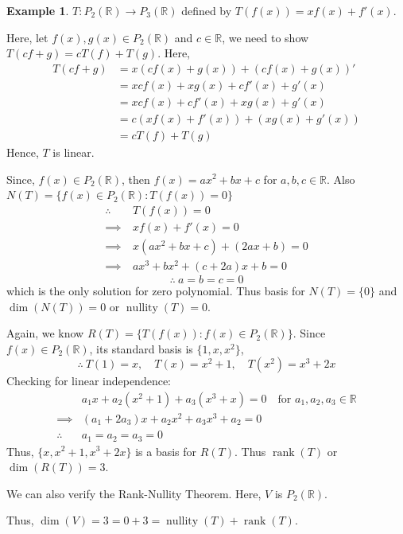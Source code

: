 \documentclass[12pt, a4paper]{article}
\theoremstyle{definition}
\newtheorem{example}{Example}[section]
\theoremstyle{remark}
\DeclareMathOperator{\nullity}{nullity}
\DeclareMathOperator{\rank}{rank}
\begin{document}
\begin{example}
    $T:P_2(\mathbb{R}) \to P_3(\mathbb{R})$ defined by $T(f(x))=xf(x)+f'(x)$.

    Here, let $f(x),g(x) \in P_2(\mathbb{R})$ and $c \in \mathbb{R}$, we need to show $T(cf+g)=cT(f)+T(g)$. Here,
    \begin{align*}
        T(cf+g) &= x(cf(x)+g(x))+(cf(x)+g(x))' \\
        &= xcf(x)+xg(x)+cf'(x)+g'(x) \\
        &= xcf(x)+cf'(x)+xg(x)+g'(x) \\
        &= c(xf(x)+f'(x)) + (xg(x)+g'(x))\\
        &= cT(f)+T(g)
    \end{align*}
    Hence, $T$ is linear.

    Since, $f(x) \in P_2(\mathbb{R})$, then $f(x) = ax^2+bx+c$ for $a,b,c \in \mathbb{R}$. Also $N(T)=\{f(x) \in P_2(\mathbb{R}): T(f(x)) = 0\}$
    \begin{align*}
        \therefore& \ T(f(x))=0 \\
        \implies& \ xf(x)+f'(x)=0 \\
        \implies& \ x(ax^2+bx+c) + (2ax+b) = 0\\
        \implies& \ ax^3 + bx^2 + (c+2a)x + b = 0
    \end{align*}
    \[
    \therefore \ a = b = c = 0
    \]
    which is the only solution for zero polynomial. Thus basis for $N(T) = \{0\}$ and $\dim(N(T))=0$ or $\nullity(T)=0$.

    Again, we know $R(T)=\{T(f(x)): f(x) \in P_2(\mathbb{R})\}$. Since $f(x) \in P_2(\mathbb{R})$, its standard basis is $\{1,x,x^2\}$,
    \[
    \therefore \ T(1)=x, \quad T(x)=x^2+1, \quad T(x^2)=x^3+2x
    \]
    Checking for linear independence:
    \begin{align*}
        & a_1x + a_2(x^2+1)+a_3(x^3+x) = 0 \quad \text{for } a_1,a_2,a_3 \in \mathbb{R} \\
        \implies & (a_1+2a_3)x+a_2x^2+a_3x^3+a_2=0\\
        \therefore \ & a_1=a_2=a_3=0
    \end{align*}
    Thus, $\{x,x^2+1,x^3+2x\}$ is a basis for $R(T)$. Thus $\rank(T)$ or $\dim(R(T))=3$.

    We can also verify the Rank-Nullity Theorem. Here, $V$ is $P_2(\mathbb{R})$. 
    
    Thus, $\dim(V)=3=0+3=\nullity(T) + \rank(T)$.
\end{example}
\end{document}
